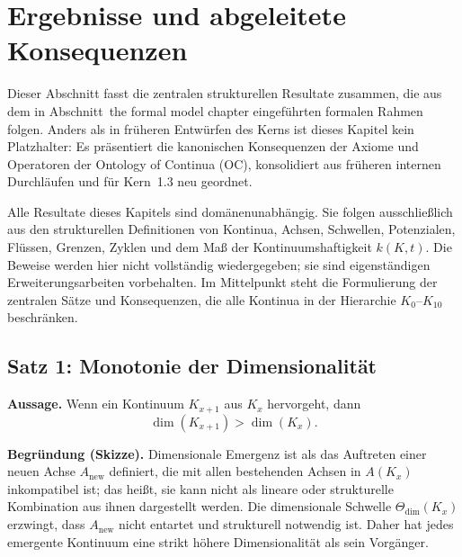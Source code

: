 \section{Ergebnisse und abgeleitete Konsequenzen}
\label{sec:results}

Dieser Abschnitt fasst die zentralen strukturellen Resultate zusammen, die aus dem in Abschnitt~the formal model chapter eingeführten formalen Rahmen folgen.
Anders als in früheren Entwürfen des Kerns ist dieses Kapitel kein Platzhalter: Es präsentiert die kanonischen Konsequenzen der Axiome und Operatoren der Ontology of Continua (OC), konsolidiert aus früheren internen Durchläufen und für Kern~1.3 neu geordnet.

Alle Resultate dieses Kapitels sind domänenunabhängig.
Sie folgen ausschließlich aus den strukturellen Definitionen von Kontinua, Achsen, Schwellen, Potenzialen, Flüssen, Grenzen, Zyklen und dem Maß der Kontinuumshaftigkeit \(k(K,t)\).
Die Beweise werden hier nicht vollständig wiedergegeben; sie sind eigenständigen Erweiterungsarbeiten vorbehalten.
Im Mittelpunkt steht die Formulierung der zentralen Sätze und Konsequenzen, die alle Kontinua in der Hierarchie \(K_0\)–\(K_{10}\) beschränken.

\subsection{Satz 1: Monotonie der Dimensionalität}

\textbf{Aussage.}
Wenn ein Kontinuum \(K_{x+1}\) aus \(K_x\) hervorgeht, dann
\[
    \dim(K_{x+1}) > \dim(K_x).
\]

\textbf{Begründung (Skizze).}
Dimensionale Emergenz ist als das Auftreten einer neuen Achse \(A_{\mathrm{new}}\) definiert, die mit allen bestehenden Achsen in \(A(K_x)\) inkompatibel ist; das heißt, sie kann nicht als lineare oder strukturelle Kombination aus ihnen dargestellt werden.
Die dimensionale Schwelle \(\Theta_{\mathrm{dim}}(K_x)\) erzwingt, dass \(A_{\mathrm{new}}\) nicht entartet und strukturell notwendig ist.
Daher hat jedes emergente Kontinuum eine strikt höhere Dimensionalität als sein Vorgänger.

